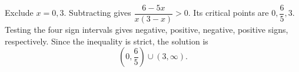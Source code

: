 Exclude $x=0,3$. Subtracting gives $\dfrac{6-5x}{x(3-x)}>0$. Its critical points are $0,\dfrac{6}{5},3$. Testing the four sign intervals gives negative, positive, negative, positive signs, respectively. Since the inequality is strict, the solution is
\[
\boxed{\left(0,\dfrac{6}{5}\right)\cup(3,\infty)}.
\]
